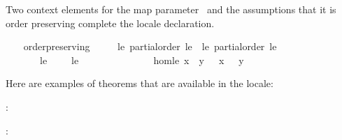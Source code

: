 \begin{isabellebody}
\begin{isamarkuptext}
  Two context elements for the map parameter~\isa{{\isasymphi}} and the
  assumptions that it is order preserving complete the locale
  declaration.%
\end{isamarkuptext}%
\isamarkuptrue%
\ \ \isamarkupfalse%
\ order{\isacharunderscore}preserving\ {\isacharequal}\isanewline
\ \ \ \ le{\isacharcolon}\ partial{\isacharunderscore}order\ le\ {\isacharplus}\ le{\isacharprime}{\isacharcolon}\ partial{\isacharunderscore}order\ le{\isacharprime}\isanewline
\ \ \ \ \ \ \ le\ {\isacharparenleft}\ {\isachardoublequoteopen}{\isasymsqsubseteq}{\isachardoublequoteclose}\ {}{}{\isacharparenright}\ \ le{\isacharprime}\ {\isacharparenleft}\ {\isachardoublequoteopen}{\isasympreceq}{\isachardoublequoteclose}\ {}{}{\isacharparenright}\ {\isacharplus}\isanewline
\ \ \ \ \ {\isasymphi}\isanewline
\ \ \ \ \ hom{\isacharunderscore}le{\isacharcolon}\ {\isachardoublequoteopen}x\ {\isasymsqsubseteq}\ y\ {\isasymLongrightarrow}\ {\isasymphi}\ x\ {\isasympreceq}\ {\isasymphi}\ y{\isachardoublequoteclose}%
\begin{isamarkuptext}%
Here are examples of theorems that are
  available in the locale:

  \hspace*{1em}: 

  \hspace*{1em}: 


\end{isamarkuptext}
\end{isabellebody}
